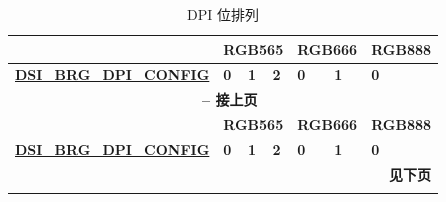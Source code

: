 \documentclass[main\_\_CN.tex]{subfiles}
\begin{document}
\scriptsize
\begin{longtable}[c]{ |p{2.5cm}|p{1cm}|p{1cm}|p{1cm}|p{1cm}|p{1cm}|p{1cm}| }
    \caption{DPI 位排列}
    \label{tab:dpi-bit-arrangement}\\\hline

    \rowcolor{lightgray}
    \textbf{} & \multicolumn{3}{|c|}{\textbf{RGB565}} & \multicolumn{2}{|c|}{\textbf{RGB666}} & \textbf{RGB888}  \\\hline
    \rowcolor{lightgray}
    \textbf{\hyperref[fielddesc:DSIBRGDPICONFIG]{DSI\_BRG\_DPI\_CONFIG}} & \textbf{0} & \textbf{1} & \textbf{2} & \textbf{0} & \textbf{1} & \textbf{0}  \\\hline
    \endfirsthead


    \multicolumn{7}{c}{\bfseries \tablename\ \thetable{} -- 接上页}\\\hline
    \rowcolor{lightgray}
    \textbf{} & \multicolumn{3}{|c|}{\textbf{RGB565}} & \multicolumn{2}{|c|}{\textbf{RGB666}} & \textbf{RGB888}  \\\hline
    \rowcolor{lightgray}
    \textbf{\hyperref[fielddesc:DSIBRGDPICONFIG]{DSI\_BRG\_DPI\_CONFIG}} & \textbf{0} & \textbf{1} & \textbf{2} & \textbf{0} & \textbf{1} & \textbf{0} \\\hline
    \endhead

    \multicolumn{7}{r}{\textbf{见下页}} \\
    \endfoot

    \endlastfoot
        

\end{longtable}
\end{document}
